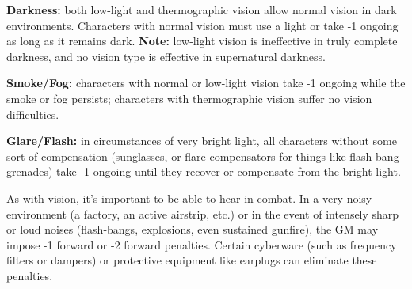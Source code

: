 \documentclass[oneside,10pt]{article}
\begin{document}
\begin{multicols}{2}
\begin{adjustwidth*}{.5cm}{.5cm}
\textbf{Darkness:} both low-light and thermographic vision allow
normal vision in dark environments. Characters with normal vision must use a light or take -1 ongoing as long as
it remains dark. \textbf{Note:} low-light vision is ineffective in truly
complete darkness, and no vision type is effective in supernatural darkness.

\textbf{Smoke/Fog:} characters with normal or low-light vision
take -1 ongoing while the smoke or fog persists; characters with thermographic vision suffer no vision
difficulties.

\textbf{Glare/Flash:} in circumstances of very bright light, all characters without some sort of compensation (sunglasses, or
flare compensators for things like flash-bang grenades)
take -1 ongoing until they recover or compensate from the
bright light.
\end{adjustwidth*}

As with vision, it’s important to be able to hear in combat.
In a very noisy environment (a factory, an active airstrip, etc.)
or in the event of intensely sharp or loud noises (flash-bangs,
explosions, even sustained gunfire), the GM may impose -1
forward or -2 forward penalties. Certain cyberware (such as
frequency filters or dampers) or protective equipment like
earplugs can eliminate these penalties.


\end{multicols}

\end{document}
